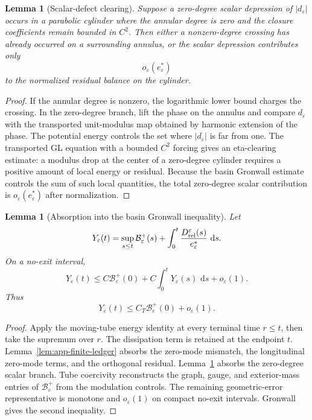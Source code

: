 \documentclass[11pt]{article}
\newtheorem{lemma}[theorem]{Lemma}
\theoremstyle{definition}
\newcommand{\dd}{\,\mathrm d}
\newcommand{\eps}{\varepsilon}
\newcommand{\estar}{e_\varepsilon^\ast}
\newcommand{\Basin}{\mathcal B}
\begin{document}
\begin{lemma}[Scalar-defect clearing]
\label{lem:app-scalar-clearing}
Suppose a zero-degree scalar depression of \(|d_\eps|\) occurs in a parabolic
cylinder where the annular degree is zero and the closure coefficients remain
bounded in \(C^2\).  Then either a nonzero-degree crossing has already occurred
on a surrounding annulus, or the scalar depression contributes only
\[
        o_\eps(\estar)
\]
to the normalized residual balance on the cylinder.
\end{lemma}

\begin{proof}
If the annular degree is nonzero, the logarithmic lower bound charges the
crossing.  In the zero-degree branch, lift the phase on the annulus and compare
\(d_\eps\) with the transported unit-modulus map obtained by harmonic extension
of the phase.  The potential energy controls the set where \(|d_\eps|\) is far
from one.  The transported GL equation with a bounded \(C^2\) forcing gives an
eta-clearing estimate: a modulus drop at the center of a zero-degree cylinder
requires a positive amount of local energy or residual.  Because the basin
Gronwall estimate controls the sum of such local quantities, the total
zero-degree scalar contribution is \(o_\eps(\estar)\) after normalization.
\end{proof}

\begin{lemma}[Absorption into the basin Gronwall inequality]
\label{lem:app-basin-gronwall}
Let
\[
        Y_\eps(t)
        =
        \sup_{s\le t}\Basin_\eps^+(s)
        +
        \int_0^t
        \frac{D_{\rm rel}^\eps(s)}{\estar}\,\dd s .
\]
On a no-exit interval,
\[
        Y_\eps(t)
        \le
        C\Basin_\eps^+(0)
        +
        C\int_0^tY_\eps(s)\,\dd s
        +
        o_\eps(1).
\]
Thus
\[
        Y_\eps(t)
        \le
        C_T\Basin_\eps^+(0)+o_\eps(1).
\]
\end{lemma}

\begin{proof}
Apply the moving-tube energy identity at every terminal time \(r\le t\), then
take the supremum over \(r\).  The dissipation term is retained at the endpoint
\(t\).  Lemma~\ref{lem:app-finite-ledger} absorbs the zero-mode mismatch, the
longitudinal zero-mode terms, and the orthogonal residual.
Lemma~\ref{lem:app-scalar-clearing} absorbs the
zero-degree scalar branch.  Tube coercivity reconstructs the graph, gauge, and
exterior-mass entries of \(\Basin_\eps^+\) from the modulation controls.  The
remaining geometric-error representative is monotone and \(o_\eps(1)\) on
compact no-exit intervals.  Gronwall gives the second inequality.
\end{proof}
\end{document}
